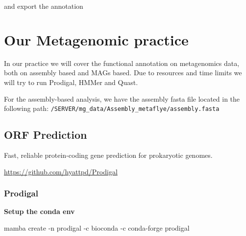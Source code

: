 \documentclass[
]{book}
\newenvironment{Shaded}{\begin{snugshade}}{\end{snugshade}}
\newcommand{\AttributeTok}[1]{\textcolor[rgb]{0.13,0.29,0.53}{#1}}
\newcommand{\BuiltInTok}[1]{#1}
\newcommand{\CommentTok}[1]{\textcolor[rgb]{0.56,0.35,0.01}{\textit{#1}}}
\newcommand{\ControlFlowTok}[1]{\textcolor[rgb]{0.13,0.29,0.53}{\textbf{#1}}}
\newcommand{\ExtensionTok}[1]{#1}
\newcommand{\KeywordTok}[1]{\textcolor[rgb]{0.13,0.29,0.53}{\textbf{#1}}}
\newcommand{\NormalTok}[1]{#1}
\newcommand{\PreprocessorTok}[1]{\textcolor[rgb]{0.56,0.35,0.01}{\textit{#1}}}
\newcommand{\StringTok}[1]{\textcolor[rgb]{0.31,0.60,0.02}{#1}}
\newcommand{\VariableTok}[1]{\textcolor[rgb]{0.00,0.00,0.00}{#1}}
\begin{document}
and export the annotation

\begin{Shaded}
\end{Shaded}

\chapter{Our Metagenomic practice}\label{our-metagenomic-practice}

In our practice we will cover the functional annotation on metagenomics data, both on assembly based and MAGs based. Due to resources and time limits we will try to run Prodigal, HMMer and Quast.

For the assembly-based analysis, we have the assembly fasta file located in the following path: \texttt{/SERVER/mg\_data/Assembly\_metaflye/assembly.fasta}

\section{ORF Prediction}\label{orf-prediction}

Fast, reliable protein-coding gene prediction for prokaryotic genomes.

\url{https://github.com/hyattpd/Prodigal}

\subsection{Prodigal}\label{prodigal}

\textbf{Setup the conda env}

\begin{Shaded}
\begin{Highlighting}[]
\ExtensionTok{mamba}\NormalTok{ create }\AttributeTok{{-}n}\NormalTok{ prodigal }\AttributeTok{{-}c}\NormalTok{ bioconda }\AttributeTok{{-}c}\NormalTok{ conda{-}forge prodigal}
\end{Highlighting}
\end{Shaded}
\end{document}
